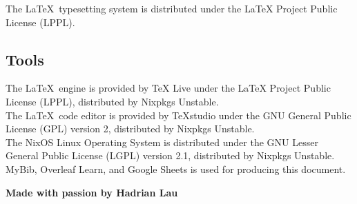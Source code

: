 \documentclass[a4paper,12pt]{article}
\begin{document}
	The \LaTeX\, typesetting system is distributed under the LaTeX Project Public License (LPPL).\\
	
	\subsection{Tools}
	The \LaTeX\, engine is provided by TeX Live under the LaTeX Project Public License (LPPL), distributed by Nixpkgs Unstable.\\
	
	The \LaTeX\, code editor is provided by TeXstudio under the GNU General Public License (GPL) version 2, distributed by Nixpkgs Unstable.\\
	
	The NixOS Linux Operating System is distributed under the GNU Lesser General Public License (LGPL) version 2.1, distributed by Nixpkgs Unstable.\\
	
	MyBib, Overleaf Learn, and Google Sheets is used for producing this document. 
	\bigskip
	\bigskip
	\begin{center}
		\textbf{Made with passion by Hadrian Lau}
	\end{center}
	
\end{document}
